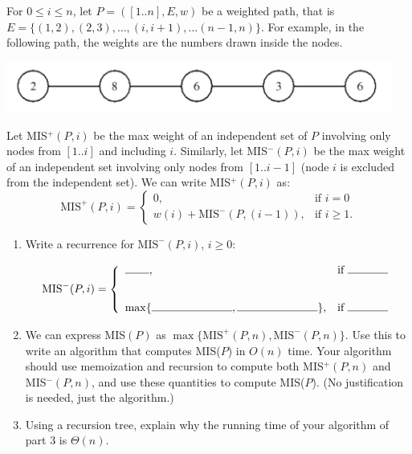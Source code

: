 \documentclass[11pt]{article}
\def\question#1{\red{#1}}
\def\red#1{{\color{red}#1}}
\begin{document}
For $0 \le i \le n$, let $P = ([1..n],E,w)$ be a weighted path, that is $E = \{(1,2),
(2,3), \ldots, (i,i+1), \ldots (n-1,n)\}$.  
For example, in the following path, the weights are the numbers drawn
inside the nodes.  

\vspace{.1in}
\hspace{.75in}
\includegraphics[width=5in]{../figs/path-graph.png}

\vspace{.1in}

\noindent
Let MIS$^+(P,i)$ be the max weight of an independent
set of $P$ involving only nodes from $[1..i]$ and including $i$.  
Similarly, let MIS$^-(P,i)$ be the max weight of an independent set
involving only nodes from $[1..i-1]$ (node $i$ is excluded from the independent
set). We can write MIS$^+(P,i)$ as:
\[
\mbox{MIS}^+(P,i) = \left \{\begin{array}{ll}
                   0, & \mbox{if } i = 0 \\
                   w(i) +  \mbox{MIS}^-(P,(i-1)), & \mbox{if } i \ge 1.
                   \end{array} \right.
\]

\begin{enumerate}
\item \question{Write a recurrence for $\mbox{MIS}^-(P,i)$, $i\ge 0$:}

\[
   \mbox{MIS}^-(P,i) = \left \{\begin{array}{ll}
                   \rule{.3in}{0.4pt}, & \mbox{if } \rule{.5in}{0.4pt} \\[.3in]
                   \max \{  \rule{1in}{0.4pt}, \rule{1in}{0.4pt} \}, & \mbox{if } \rule{.5in}{0.4pt} \\
                   \end{array} \right.
   \]

\item 
We can express MIS$(P)$ as $\max \{\mbox{MIS}^+(P,n), \mbox{MIS}^-(P,n) \}$. 
\question{Use this to write an algorithm that computes MIS($P$) in $O(n)$ time.}  
Your algorithm should use memoization and recursion to compute both
MIS$^+(P,n)$ and MIS$^-(P,n)$, and use these quantities to compute
MIS($P$). (No justification is needed, just the algorithm.)

\item \question{Using a recursion tree, explain why the running time of your algorithm of part 3 is $\Theta(n)$.}
\end{enumerate}
\end{document}
